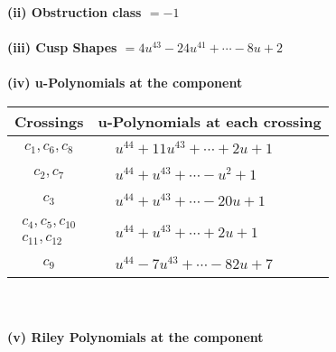\documentclass[1p]{elsarticle_modified}
\theoremstyle{definition}
\begin{document}
\flushleft \textbf{(ii) Obstruction class $= -1$}\\~\\
\flushleft \textbf{(iii) Cusp Shapes $= 4 u^{43}-24 u^{41}+\cdots-8 u+2$}\\~\\
\newpage\renewcommand{\arraystretch}{1}
\flushleft \textbf{(iv) u-Polynomials at the component}\newline \\
\begin{tabular}{m{50pt}|m{274pt}}
Crossings & \hspace{64pt}u-Polynomials at each crossing \\
\hline $$\begin{aligned}c_{1},c_{6},c_{8}\end{aligned}$$&$\begin{aligned}
&u^{44}+11 u^{43}+\cdots+2 u+1
\end{aligned}$\\
\hline $$\begin{aligned}c_{2},c_{7}\end{aligned}$$&$\begin{aligned}
&u^{44}+u^{43}+\cdots- u^2+1
\end{aligned}$\\
\hline $$\begin{aligned}c_{3}\end{aligned}$$&$\begin{aligned}
&u^{44}+u^{43}+\cdots-20 u+1
\end{aligned}$\\
\hline $$\begin{aligned}c_{4},c_{5},c_{10}\\c_{11},c_{12}\end{aligned}$$&$\begin{aligned}
&u^{44}+u^{43}+\cdots+2 u+1
\end{aligned}$\\
\hline $$\begin{aligned}c_{9}\end{aligned}$$&$\begin{aligned}
&u^{44}-7 u^{43}+\cdots-82 u+7
\end{aligned}$\\
\hline
\end{tabular}\\~\\
\newpage\renewcommand{\arraystretch}{1}
\flushleft \textbf{(v) Riley Polynomials at the component}\newline \\
\end{document}
